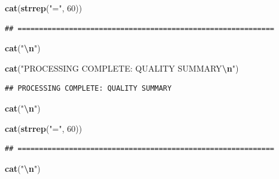 \documentclass[
]{article}
\newenvironment{Shaded}{\begin{snugshade}}{\end{snugshade}}
\newcommand{\DecValTok}[1]{\textcolor[rgb]{0.00,0.00,0.81}{#1}}
\newcommand{\FunctionTok}[1]{\textcolor[rgb]{0.13,0.29,0.53}{\textbf{#1}}}
\newcommand{\NormalTok}[1]{#1}
\newcommand{\SpecialCharTok}[1]{\textcolor[rgb]{0.81,0.36,0.00}{\textbf{#1}}}
\newcommand{\StringTok}[1]{\textcolor[rgb]{0.31,0.60,0.02}{#1}}
\begin{document}
\begin{Shaded}
\begin{Highlighting}[]
\FunctionTok{cat}\NormalTok{(}\FunctionTok{strrep}\NormalTok{(}\StringTok{"="}\NormalTok{, }\DecValTok{60}\NormalTok{))}
\end{Highlighting}
\end{Shaded}

\begin{verbatim}
## ============================================================
\end{verbatim}

\begin{Shaded}
\begin{Highlighting}[]
\FunctionTok{cat}\NormalTok{(}\StringTok{"}\SpecialCharTok{\textbackslash{}n}\StringTok{"}\NormalTok{)}
\end{Highlighting}
\end{Shaded}

\begin{Shaded}
\begin{Highlighting}[]
\FunctionTok{cat}\NormalTok{(}\StringTok{"PROCESSING COMPLETE: QUALITY SUMMARY}\SpecialCharTok{\textbackslash{}n}\StringTok{"}\NormalTok{)}
\end{Highlighting}
\end{Shaded}

\begin{verbatim}
## PROCESSING COMPLETE: QUALITY SUMMARY
\end{verbatim}

\begin{Shaded}
\begin{Highlighting}[]
\FunctionTok{cat}\NormalTok{(}\StringTok{"}\SpecialCharTok{\textbackslash{}n}\StringTok{"}\NormalTok{)}
\end{Highlighting}
\end{Shaded}

\begin{Shaded}
\begin{Highlighting}[]
\FunctionTok{cat}\NormalTok{(}\FunctionTok{strrep}\NormalTok{(}\StringTok{"="}\NormalTok{, }\DecValTok{60}\NormalTok{))}
\end{Highlighting}
\end{Shaded}

\begin{verbatim}
## ============================================================
\end{verbatim}

\begin{Shaded}
\begin{Highlighting}[]
\FunctionTok{cat}\NormalTok{(}\StringTok{"}\SpecialCharTok{\textbackslash{}n}\StringTok{"}\NormalTok{)}
\end{Highlighting}
\end{Shaded}
\end{document}
